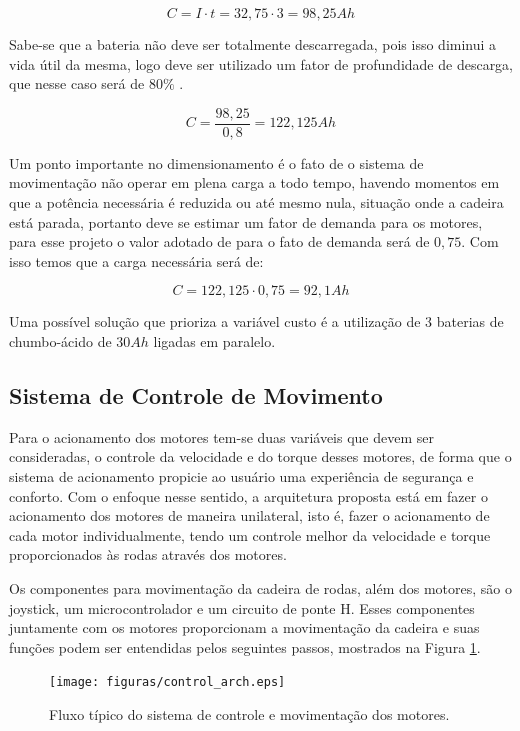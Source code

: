 \begin{equation}
C = I \cdot t = 32,75 \cdot 3 = 98,25 Ah
\end{equation}

Sabe-se que a bateria não deve ser totalmente descarregada, pois isso diminui a
vida útil da mesma, logo deve ser utilizado um fator de profundidade de descarga,
que nesse caso será de $80\%$ \cite{KARASINSKI}.

\begin{equation}
C = \frac{98,25}{0,8} = 122,125 Ah
\end{equation}

Um ponto importante no dimensionamento é o fato de o sistema de movimentação não
operar em plena carga a todo tempo, havendo momentos em que a potência necessária
é reduzida ou até mesmo nula, situação onde a cadeira está parada, portanto deve
se estimar um fator de demanda para os motores, para esse projeto o valor
adotado de para o fato de demanda será de $0,75$. Com isso temos que a carga
necessária será de:

\begin{equation}
C = 122,125 \cdot 0,75 = 92,1Ah
\end{equation}

Uma possível solução que prioriza a variável custo é a utilização de $3$ baterias
de chumbo-ácido de $30 Ah$ ligadas em paralelo.

\subsection{Sistema de Controle de Movimento}
Para o acionamento dos motores tem-se duas variáveis que devem 
ser consideradas, o controle da velocidade e do torque desses 
motores, de forma que o sistema de acionamento propicie ao usuário 
uma experiência de segurança e conforto. Com o enfoque nesse sentido, 
a arquitetura proposta está em fazer o acionamento dos motores de 
maneira unilateral, isto é, fazer o acionamento de cada motor 
individualmente, tendo um controle melhor da velocidade e torque 
proporcionados às rodas através dos motores.

Os componentes para movimentação da cadeira de rodas, além 
dos motores, são o joystick, um microcontrolador e um circuito 
de ponte H. Esses componentes juntamente com os motores proporcionam 
a movimentação da cadeira e suas funções podem ser entendidas 
pelos seguintes passos, mostrados na Figura \ref{fig:control_arch}.

\begin{figure}[H]
  \centering
    \texttt{[image: figuras/control\_arch.eps]}
  \caption{Fluxo típico do sistema de controle e movimentação dos motores.}
  \label{fig:control_arch}
\end{figure}

